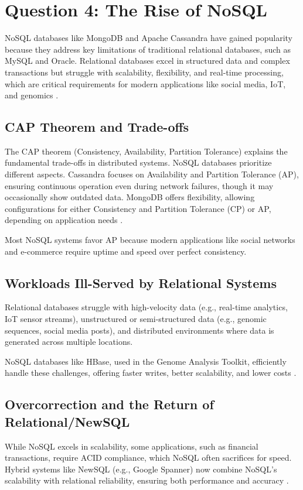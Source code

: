 \section{Question 4: The Rise of NoSQL}
\label{sec:question4}

NoSQL databases like MongoDB and Apache Cassandra have gained popularity because they address key limitations of traditional relational databases, such as MySQL and Oracle. Relational databases excel in structured data and complex transactions but struggle with scalability, flexibility, and real-time processing, which are critical requirements for modern applications like social media, IoT, and genomics \cite{wu2014, chen2014}.

\subsection*{CAP Theorem and Trade-offs}
The CAP theorem (Consistency, Availability, Partition Tolerance) explains the fundamental trade-offs in distributed systems. NoSQL databases prioritize different aspects. Cassandra focuses on Availability and Partition Tolerance (AP), ensuring continuous operation even during network failures, though it may occasionally show outdated data. MongoDB offers flexibility, allowing configurations for either Consistency and Partition Tolerance (CP) or AP, depending on application needs \cite{scylla2025, wikipedia2026}.

Most NoSQL systems favor AP because modern applications like social networks and e-commerce require uptime and speed over perfect consistency.

\subsection*{Workloads Ill-Served by Relational Systems}
Relational databases struggle with high-velocity data (e.g., real-time analytics, IoT sensor streams), unstructured or semi-structured data (e.g., genomic sequences, social media posts), and distributed environments where data is generated across multiple locations.

NoSQL databases like HBase, used in the Genome Analysis Toolkit, efficiently handle these challenges, offering faster writes, better scalability, and lower costs \cite{mckenna2010, taylor2010}.

\subsection*{Overcorrection and the Return of Relational/NewSQL}
While NoSQL excels in scalability, some applications, such as financial transactions, require ACID compliance, which NoSQL often sacrifices for speed. Hybrid systems like NewSQL (e.g., Google Spanner) now combine NoSQL's scalability with relational reliability, ensuring both performance and accuracy \cite{memgraph2023}.
